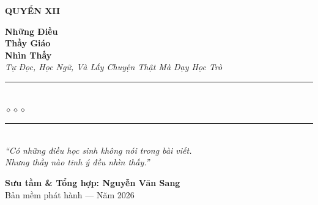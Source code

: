 \begin{titlepage}
\begin{center}
  \begin{tcolorbox}[
    width=6.5cm,
    colback=chalkgold!20,
    colframe=chalkgold!80!black,
    arc=4pt,
    boxrule=1.5pt,
    halign=center
  ]
    {\fontsize{18}{22}\selectfont\bfseries\color{teacherblue!80!black}
     QUYỂN XII}
  \end{tcolorbox}
  \vspace{0.8cm}

  {\fontsize{28}{34}\selectfont\bfseries\color{teacherblue!80!black}
    Những Điều}\\[0.4cm]
  {\fontsize{28}{34}\selectfont\bfseries\color{chalkgold!80!black}
    Thầy Giáo}\\[0.4cm]
  {\fontsize{28}{34}\selectfont\bfseries\color{teacherblue!80!black}
    Nhìn Thấy}\\[0.4cm]

  {\fontsize{16}{20}\selectfont\color{chalkgold!90!black}\itshape
    Tự Đọc, Học Ngữ, Và Lấy Chuyện Thật Mà Dạy Học Trò}\\[1cm]

  {\color{inkbrown!60}\rule{6cm}{1pt}}\\[5pt]
  {\color{chalkgold!80!black}\large$\diamond$\hspace{1cm}$\diamond$\hspace{1cm}$\diamond$}\\[5pt]
  {\color{inkbrown!60}\rule{6cm}{1pt}}\\[1.5cm]

  {\normalsize\itshape\color{inkbrown!90!black}
   ``Có những điều học sinh không nói trong bài viết.\\
   Nhưng thầy nào tinh ý đều nhìn thấy.''}

  \vfill

  {\fontsize{16}{20}\selectfont\bfseries\color{inkbrown!90!black}
    Sưu tầm \& Tổng hợp: \textbf{Nguyễn Văn Sang}}\\[0.4cm]

  {\small\color{gray} Bản mềm phát hành --- Năm 2026}\\[0.5cm]
\end{center}

\afterpage{\nopagecolor}
\end{titlepage}